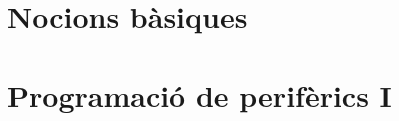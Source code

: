 


\pagestyle{empty} %

\tableofcontents %

\cleardoublepage %

\pagestyle{fancy} %


\part{Nocions bàsiques}







\part{Programació de perifèrics I}
\label{part:programacio}


